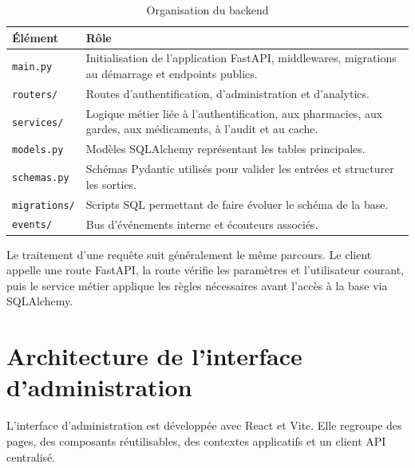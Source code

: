 \begin{table}[H]
    \centering
    \caption{Organisation du backend}
    \begin{tabular}{L{4cm}L{9cm}}
        \toprule
        \textbf{Élément} & \textbf{Rôle} \\
        \midrule
        \texttt{main.py} & Initialisation de l'application FastAPI, middlewares, migrations au démarrage et endpoints publics. \\
        \texttt{routers/} & Routes d'authentification, d'administration et d'analytics. \\
        \texttt{services/} & Logique métier liée à l'authentification, aux pharmacies, aux gardes, aux médicaments, à l'audit et au cache. \\
        \texttt{models.py} & Modèles SQLAlchemy représentant les tables principales. \\
        \texttt{schemas.py} & Schémas Pydantic utilisés pour valider les entrées et structurer les sorties. \\
        \texttt{migrations/} & Scripts SQL permettant de faire évoluer le schéma de la base. \\
        \texttt{events/} & Bus d'événements interne et écouteurs associés. \\
        \bottomrule
    \end{tabular}
\end{table}

Le traitement d'une requête suit généralement le même parcours. Le client appelle une route FastAPI, la
route vérifie les paramètres et l'utilisateur courant, puis le service métier applique les règles nécessaires
avant l'accès à la base via SQLAlchemy.

\section{Architecture de l'interface d'administration}

L'interface d'administration est développée avec React et Vite. Elle regroupe des pages, des composants
réutilisables, des contextes applicatifs et un client API centralisé.

